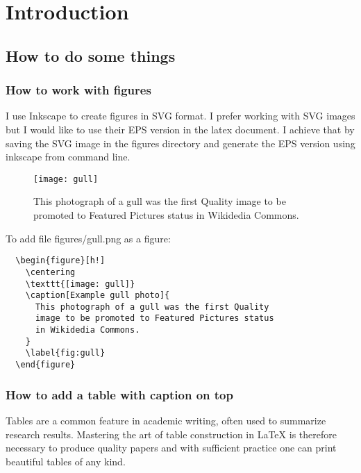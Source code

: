 \chapter{Introduction}

\section{How to do some things}

\subsection{How to work with figures}

I use Inkscape\cite{inkscape} to create figures in SVG format.
I prefer working with SVG images but I would like to use their EPS version
in the latex document.
I achieve that by saving the SVG image in the figures directory and generate
the EPS version using inkscape from command line.

\begin{figure}[h!]
  \centering
  \texttt{[image: gull]}
  \caption[Example gull photo]{
    This photograph of a gull was the first Quality
    image to be promoted to Featured Pictures status
    in Wikidedia Commons.
  }
  \label{fig:gull}
\end{figure}

To add file figures/gull.png as a figure:

\begin{verbatim}
  \begin{figure}[h!]
    \centering
    \texttt{[image: gull]}
    \caption[Example gull photo]{
      This photograph of a gull was the first Quality
      image to be promoted to Featured Pictures status
      in Wikidedia Commons.
    }
    \label{fig:gull}
  \end{figure}
\end{verbatim}

\subsection{How to add a table with caption on top}

Tables are a common feature in academic writing, often used to summarize
research results. Mastering the art of table construction in LaTeX is therefore
necessary to produce quality papers and with sufficient practice one can print
beautiful tables of any kind. \cite{latextables}

